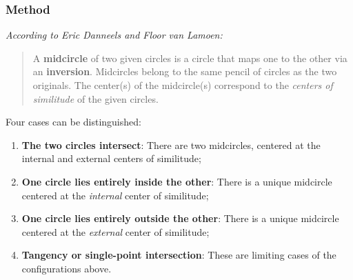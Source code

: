 \begin{tkzexample}[latex=.5\textwidth]
\end{tkzexample}


\subsubsection{Method } %
\label{ssub:midcircle}

\medskip
\noindent
\emph{According to Eric Danneels and Floor van Lamoen:}

\begin{quote}
A \textbf{midcircle} of two given circles is a circle that maps one to the other via an \textbf{inversion}. Midcircles belong to the same pencil of circles as the two originals. The center(s) of the midcircle(s) correspond to the \emph{centers of similitude} of the given circles.
\end{quote}

\noindent
Four cases can be distinguished:

\begin{enumerate}[label=(\roman*)]
  \item \textbf{The two circles intersect}: There are two midcircles, centered at the internal and external centers of similitude;
  \item \textbf{One circle lies entirely inside the other}: There is a unique midcircle centered at the \emph{internal} center of similitude;
  \item \textbf{One circle lies entirely outside the other}: There is a unique midcircle centered at the \emph{external} center of similitude;
  \item \textbf{Tangency or single-point intersection}: These are limiting cases of the configurations above.
\end{enumerate}



